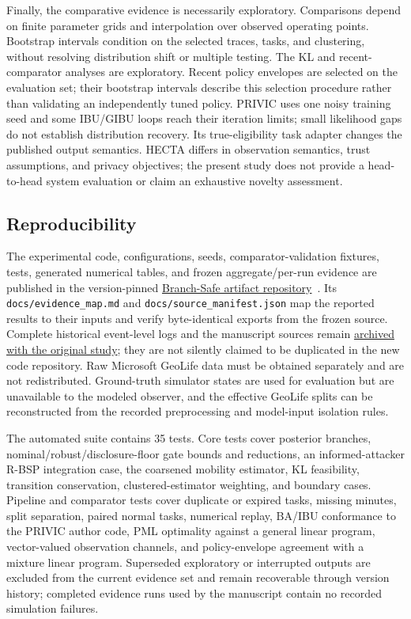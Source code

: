 \documentclass[10pt,journal,compsoc]{IEEEtran}
\begin{document}
Finally, the comparative evidence is necessarily exploratory. Comparisons depend on finite parameter grids and interpolation over observed operating points. Bootstrap intervals condition on the selected traces, tasks, and clustering, without resolving distribution shift or multiple testing. The KL and recent-comparator analyses are exploratory. Recent policy envelopes are selected on the evaluation set; their bootstrap intervals describe this selection procedure rather than validating an independently tuned policy. PRIVIC uses one noisy training seed and some IBU/GIBU loops reach their iteration limits; small likelihood gaps do not establish distribution recovery. Its true-eligibility task adapter changes the published output semantics. HECTA differs in observation semantics, trust assumptions, and privacy objectives; the present study does not provide a head-to-head system evaluation or claim an exhaustive novelty assessment.

\subsection{Reproducibility}
The experimental code, configurations, seeds, comparator-validation fixtures, tests, generated numerical tables, and frozen aggregate/per-run evidence are published in the version-pinned \href{https://github.com/js110/Branch-Safe/tree/2dfaeeced5bb162203fa689b482d229371a17671}{Branch-Safe artifact repository}~\cite{bspartifact2026}. Its \texttt{docs/evidence\_map.md} and \texttt{docs/source\_manifest.json} map the reported results to their inputs and verify byte-identical exports from the frozen source. Complete historical event-level logs and the manuscript sources remain \href{https://github.com/js110/Bpaper/tree/2cc94ff6e7c4696dc364392dc19c8137d0cb7e65}{archived with the original study}; they are not silently claimed to be duplicated in the new code repository. Raw Microsoft GeoLife data must be obtained separately and are not redistributed. Ground-truth simulator states are used for evaluation but are unavailable to the modeled observer, and the effective GeoLife splits can be reconstructed from the recorded preprocessing and model-input isolation rules.

The automated suite contains 35 tests. Core tests cover posterior branches, nominal/robust/disclosure-floor gate bounds and reductions, an informed-attacker R-BSP integration case, the coarsened mobility estimator, KL feasibility, transition conservation, clustered-estimator weighting, and boundary cases. Pipeline and comparator tests cover duplicate or expired tasks, missing minutes, split separation, paired normal tasks, numerical replay, BA/IBU conformance to the PRIVIC author code, PML optimality against a general linear program, vector-valued observation channels, and policy-envelope agreement with a mixture linear program. Superseded exploratory or interrupted outputs are excluded from the current evidence set and remain recoverable through version history; completed evidence runs used by the manuscript contain no recorded simulation failures.
\end{document}
